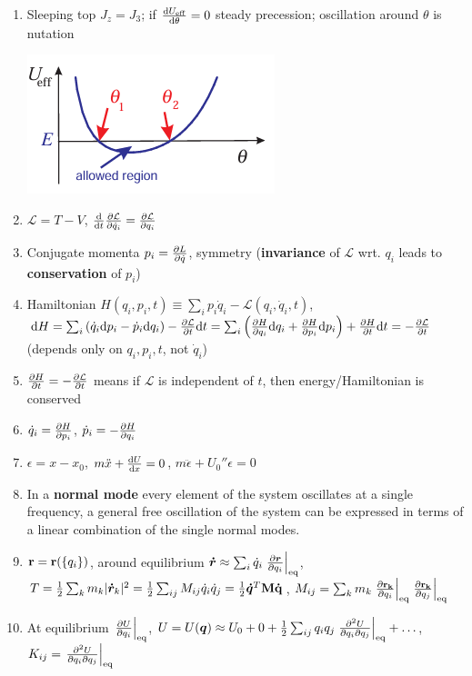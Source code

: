 \documentclass{article}
\theoremstyle{remark}
\theoremstyle{remark}
\begin{document}
\begin{enumerate}
    \item Sleeping top $J_z=J_3$; if $\dv{U_{\mathrm{eff}}}{\theta}=0$ steady precession; oscillation around $\theta$ is nutation
    \begin{center}
        \includegraphics*[width=0.3\linewidth]{symmetric top effective potential.png}
    \end{center}

    \item $\mathcal{L}=T-V$, $\dv{t}\pdv{\mathcal{L}}{\dot q_i}=\pdv{\mathcal{L}}{q_i}$
    \item Conjugate momenta $p_i=\pdv{L}{\dot q}$, symmetry (\textbf{invariance} of $\mathcal{L}$ wrt. $q_i$ leads to \textbf{conservation} of $p_i$)
    \item Hamiltonian $H(q_i,p_i,t)\equiv\sum_i p_i\dot q_i-\mathcal{L}(q_i,\dot q_i,t)$, 
    $\dd H=\sum_i\left(\dot q_i\dd p_i-\dot p_i\dd q_i\right)-\pdv{\mathcal{L}}{t}\dd t \allowbreak= \sum_i\left(\pdv{H}{q_i}\dd q_i+\pdv{H}{p_i}\dd p_i\right)+\pdv{H}{t}\dd t \allowbreak= -\pdv{\mathcal{L}}{t}$ (depends only on $q_i,p_i,t$, not $\dot q_i$)
    \item $\pdv{H}{t}=-\pdv{\mathcal{L}}{t}$ means if $\mathcal{L}$ is independent of $t$, then energy/Hamiltonian is conserved
    \item $\dot q_i=\pdv{H}{p_i}$, $\dot p_i=-\pdv{H}{q_i}$
    \item $\epsilon=x-x_0$, $m\ddot x+\dv{U}{x}=0$, $m\ddot\epsilon+U_0''\epsilon=0$
    \item In a \textbf{normal mode} every element of the system oscillates at a single frequency, a general free oscillation of the system can be expressed in terms of a linear combination of the single normal modes.
    \item $\vb{r}=\vb{r}(\{q_i\})$, around equilibrium $\bm{\dot r}\approx\sum_i\dot q_i\eval{\pdv{\bm{r}}{q_i}}_{\mathrm{eq}}$, $T=\frac{1}{2}\sum_k m_k|\bm{\dot r}_k|^2 = \frac{1}{2}\sum_{ij}M_{ij}\dot q_i\dot q_j = \frac{1}{2}\bm{\dot q}^T\bf{M}\bf{\dot q}$, $M_{ij}=\sum_k m_k\eval{\pdv{\bf{r_k}}{q_i}}_{\mathrm{eq}}\eval{\pdv{\bf{r_k}}{q_j}}_{\mathrm{eq}}$
    \item At equilibrium $\eval{\pdv{U}{q_i}}_{\mathrm{eq}}$, $U=U(\bm{q})\approx U_0+0+\frac{1}{2}\sum_{ij}q_i q_j\eval{\pdv{^2U}{q_i \partial q_j}}_{\mathrm{eq}}+\ldots$, $K_{ij}=\eval{\pdv{^2U}{q_i \partial q_j}}_{\mathrm{eq}}$

\end{enumerate}
\end{document}
